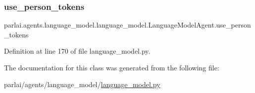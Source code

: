 \subsubsection{\texorpdfstring{use\+\_\+person\+\_\+tokens}{use\_person\_tokens}}
{\footnotesize\ttfamily parlai.\+agents.\+language\+\_\+model.\+language\+\_\+model.\+Language\+Model\+Agent.\+use\+\_\+person\+\_\+tokens}



Definition at line 170 of file language\+\_\+model.\+py.



The documentation for this class was generated from the following file\+:\begin{DoxyCompactItemize}
\item 
parlai/agents/language\+\_\+model/\hyperlink{language__model_8py}{language\+\_\+model.\+py}\end{DoxyCompactItemize}
